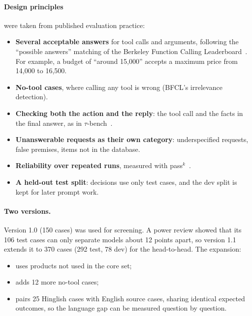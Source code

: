 \documentclass[11pt,a4paper]{article}
\begin{document}
\paragraph{Design principles} were taken from published evaluation practice:
\begin{itemize}
  \item \textbf{Several acceptable answers} for tool calls and arguments, following the ``possible answers'' matching of
        the Berkeley Function Calling Leaderboard~\cite{bfcl}. For example, a budget of ``around 15,000'' accepts a
        maximum price from 14,000 to 16,500.
  \item \textbf{No-tool cases}, where calling any tool is wrong (BFCL's irrelevance detection).
  \item \textbf{Checking both the action and the reply}: the tool call and the facts in the final answer, as in
        $\tau$-bench~\cite{taubench}.
  \item \textbf{Unanswerable requests as their own category}: underspecified requests, false premises, items not in the
        database.
  \item \textbf{Reliability over repeated runs}, measured with pass$^k$~\cite{taubench}.
  \item \textbf{A held-out test split}: decisions use only test cases, and the dev split is kept for later prompt work.
\end{itemize}

\paragraph{Two versions.} Version 1.0 (150 cases) was used for screening. A power review showed that its 106 test cases
can only separate models about 12 points apart, so version 1.1 extends it to 370 cases (292 test, 78 dev) for the
head-to-head. The expansion:
\begin{itemize}
  \item uses products not used in the core set;
  \item adds 12 more no-tool cases;
  \item pairs 25 Hinglish cases with English source cases, sharing identical expected outcomes, so the language gap can be
        measured question by question.
\end{itemize}
\end{document}
